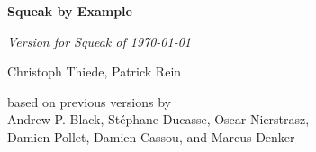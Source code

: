 \begin{titlepage}
   \begin{center}
		\vspace*{1cm}

		\huge\textbf{Squeak by Example}

		\vspace{0.5cm}

		\normalsize\emph{Version{\ifdefined\SQUEAKVERSION
			\space{}for Squeak \SQUEAKVERSION%
			\else\fi\space{}of \today}}%

      	\vspace{0.5cm}

		\large Christoph Thiede, Patrick Rein

		\vspace{0.5cm}

		based on previous versions by \\
		Andrew P. Black, St\'ephane Ducasse, Oscar Nierstrasz, \\
		Damien Pollet, Damien Cassou, and Marcus Denker

   \end{center}
\end{titlepage}

